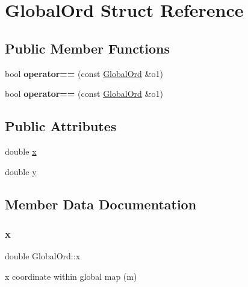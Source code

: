 \hypertarget{structGlobalOrd}{}\section{Global\+Ord Struct Reference}
\label{structGlobalOrd}
\subsection*{Public Member Functions}
\begin{DoxyCompactItemize}
\item 
\mbox{\label{structGlobalOrd_a58aa85821a795e025b0e72463dec2bbb}} 
bool {\bfseries operator==} (const \hyperlink{structGlobalOrd}{Global\+Ord} \&o1)
\item 
\mbox{\label{structGlobalOrd_a58aa85821a795e025b0e72463dec2bbb}} 
bool {\bfseries operator==} (const \hyperlink{structGlobalOrd}{Global\+Ord} \&o1)
\end{DoxyCompactItemize}
\subsection*{Public Attributes}
\begin{DoxyCompactItemize}
\item 
double \hyperlink{structGlobalOrd_a59539a3081973edb2ec3789f71943923}{x}
\item 
double \hyperlink{structGlobalOrd_af9f9e1597f7373a92ce693c10acec8a5}{y}
\end{DoxyCompactItemize}


\subsection{Member Data Documentation}
\mbox{\label{structGlobalOrd_a59539a3081973edb2ec3789f71943923}} 
\subsubsection{\texorpdfstring{x}{x}}
{\footnotesize\ttfamily double Global\+Ord\+::x}

x coordinate within global map (m) \mbox{\label{structGlobalOrd_af9f9e1597f7373a92ce693c10acec8a5}} 
